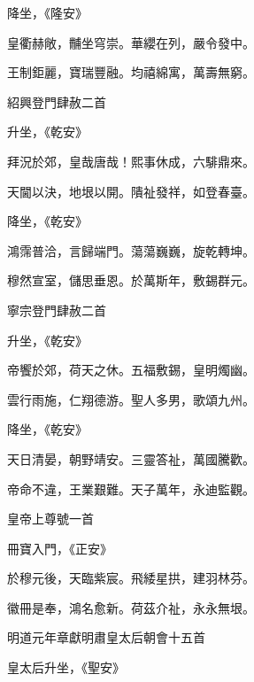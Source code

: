 \begin{pinyinscope}
 降坐，《隆安》



 皇衢赫敞，黼坐穹崇。華纓在列，嚴令發中。



 王制鉅麗，寶瑞豐融。均禧綿寓，萬壽無窮。



 紹興登門肆赦二首



 升坐，《乾安》



 拜況於郊，皇哉唐哉！熙事休成，六騑鼎來。



 天閫以決，地垠以開。隤祉發祥，如登春臺。



 降坐，《乾安》



 鴻霈普洽，言歸端門。蕩蕩巍巍，旋乾轉坤。



 穆然宣室，儲思垂恩。於萬斯年，敷錫群元。



 寧宗登門肆赦二首



 升坐，《乾安》



 帝饗於郊，荷天之休。五福敷錫，皇明燭幽。



 雲行雨施，仁翔德游。聖人多男，歌頌九州。



 降坐，《乾安》



 天日清晏，朝野靖安。三靈答祉，萬國騰歡。



 帝命不違，王業艱難。天子萬年，永迪監觀。



 皇帝上尊號一首



 冊寶入門，《正安》



 於穆元後，天臨紫宸。飛緌星拱，建羽林芬。



 徽冊是奉，鴻名愈新。荷茲介祉，永永無垠。



 明道元年章獻明肅皇太后朝會十五首



 皇太后升坐，《聖安》




\end{pinyinscope}
